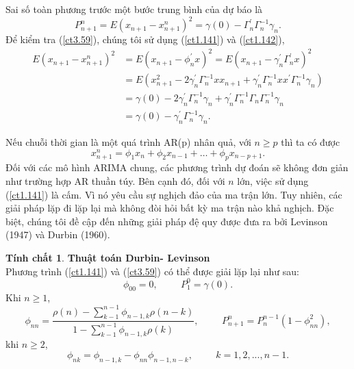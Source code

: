\documentclass[12pt, a4paper,oneside]{book}
\theoremstyle{definition}
\newtheorem{tc}[theo]{Tính chất}
\begin{document}
Sai số toàn phương trước một bước trung bình của dự báo là
\begin{equation}
P_{n+1}^{n} = E (x_{n+1} - x_{n+1}^{n})^{2} = \gamma(0) - \Gamma^{'}_{n}\Gamma_n^{-1}\gamma_{n}. \label{ct3.59}
\end{equation}	
Để kiểm tra (\ref{ct3.59}), chúng tôi sử dụng (\ref{ct1.141}) và (\ref{ct1.142}),
\begin{align*}
E(x_{n+1}- x_{n+1}^{n})^{2} &= E(x_{n+1} - \phi_{n}^{'}x)^{2}= E(x_{n+1} - \gamma_n^{'}\Gamma^{'}_{n}x)^{2}\\& = E(x_{n+1}^{2} - 2\gamma^{'}_{n}\Gamma^{-1}_{n}xx_{n+1} + \gamma^{'}_{n}\Gamma^{-1}_{n}xx^{'}\Gamma^{-1}_{n}\gamma_{n})\\ & =\gamma(0) -2\gamma^{'}_{n}\Gamma^{-1}_{n}\gamma_n+ \gamma^{'}_{n}\Gamma^{-1}_{n}\Gamma_n\Gamma_n^{-1}\gamma_n\\ & =\gamma(0)-\gamma_n^{'}\Gamma_n^{-1}\gamma_n.
\end{align*}

Nếu chuỗi thời gian là một quá trình AR(p) nhân quả, với $n\geq p$ thì ta có được
\begin{equation}
x_{n+1}^{n}=\phi_1x_n+\phi_2x_{n-1}+\dots+\phi_px_{n-p+1}. \label{ct3.60}
\end{equation}
Đối với các mô hình ARIMA chung, các phương trình dự đoán sẽ không đơn giản như trường hợp AR thuần túy. Bên cạnh đó, đối với $n$ lớn, việc sử dụng (\ref{ct1.141}) là cấm. Vì nó yêu cầu sự nghịch đảo của ma trận lớn. Tuy nhiên, các giải pháp lặp đi lặp lại mà không đòi hỏi bất kỳ ma trận nào khả nghịch. Đặc biệt, chúng tôi đề cập đến những giải pháp đệ quy được đưa ra bởi Levinson (1947) và Durbin (1960).
\begin{tc}\textbf{Thuật toán  Durbin- Levinson}\\
Phương trình (\ref{ct1.141}) và (\ref{ct3.59}) có thể được giải lặp lại như sau: 
\begin{equation}
\phi_{00}= 0 , \hspace{1cm} P_{1}^{0}= \gamma(0). \label{ct1.144}
\end{equation} 
Khi $n\geq 1$,
\begin{equation}
\phi_{nn} = \dfrac{\rho(n) - \sum_{k-1}^{n-1}\phi_{n-1,k}\rho
(n-k)}{1- \sum_{k-1}^{n-1}\phi_{n-1,k}\rho(k)}, \hspace{1cm}  P_{n+1}^{n}= P_{n}^{n-1}(1 - \phi_{nn}^{2}), \label{ct1.145}
\end{equation}
khi $n\geq 2$,
\begin{equation}
\phi_{nk} = \phi_{n-1,k}- \phi_{nn}\phi_{n-1,n-k}, \hspace{1cm}  k=1,2,...,n-1. \label{ct1.146}
\end{equation}
\end{tc}
\end{document}
